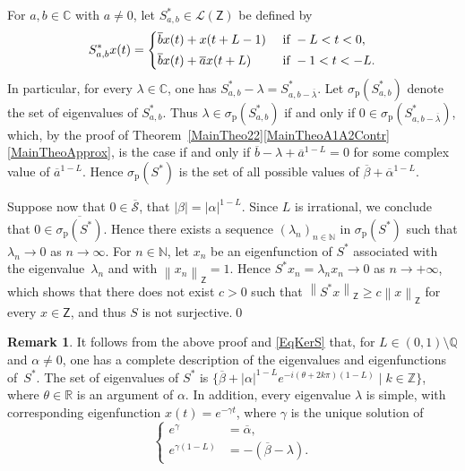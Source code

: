 \documentclass[JEP,XML,SOM,Unicode]{cedram}
\theoremstyle{plain}
\theoremstyle{definition}
\newtheorem{remk}[theo]{Remark}
\newcommand{\norm}[1]{\left\lVert #1\right\lVert}
\newcommand{\abs}[1]{\left\lvert #1\right \rvert}
\begin{document}
For $a, b \in \mathbb C$ with $a \neq 0$, let $S_{a, b}^\ast \in \mathcal L(\mathsf Z)$ be defined by
\[
S_{a, b}^\ast x(t) =
\begin{dcases}
\overline b x(t) + x(t + L - 1) & \text{ if } -L < t < 0, \\
\overline b x(t) + \overline a x(t + L) & \text{ if } -1 < t < -L.
\end{dcases}
\]
In particular, for every $\lambda \in \mathbb C$, one has $S_{a, b}^\ast - \lambda = S_{a, b - \overline\lambda}^\ast$. Let $\sigma_{\mathrm p}(S_{a, b}^\ast)$ denote the set of eigenvalues of $S_{a, b}^\ast$. Thus $\lambda \in \sigma_{\mathrm p}(S_{a, b}^\ast)$ if and only if $0 \in \sigma_{\mathrm p}(S_{a, b - \overline\lambda}^\ast)$, which, by the proof of Theorem~\ref{MainTheo22}\eqref{MainTheoA1A2Contr}\eqref{MainTheoApprox}, is the case if and only if $\overline b - \lambda + \overline a^{1-L} = 0$ for some complex value of $\overline a^{1-L}$. Hence $\sigma_{\mathrm p}(S^\ast)$ is the set of all possible values of $\overline\beta + \overline\alpha^{1-L}$.

Suppose now that $0 \in \overline{\mathcal S}$, \ie that $\abs{\beta} = \abs{\alpha}^{1-L}$. Since $L$ is irrational, we conclude that $0 \in \overline{\sigma_{\mathrm p}(S^\ast)}$. Hence there exists a sequence $(\lambda_n)_{n \in \mathbb N}$ in $\sigma_{\mathrm p}(S^\ast)$ such that $\lambda_n \to 0$ as $n \to \infty$. For $n \in \mathbb N$, let $x_n$ be an eigenfunction of $S^\ast$ associated with the eigenvalue~$\lambda_n$ and with $\norm{x_n}_{\mathsf Z} = 1$. Hence $S^\ast x_n = \lambda_n x_n \to 0$ as $n \to +\infty$, which shows that there does not exist $c > 0$ such that $\norm{S^\ast x}_{\mathsf Z} \geq c \norm{x}_{\mathsf Z}$ for every $x \in \mathsf Z$, and thus $S$ is not surjective.\qed

\begin{remk}
\label{RemkEigenpairsS}
It follows from the above proof and \eqref{EqKerS} that, for $L \in (0, 1) \setminus \mathbb Q$ and $\alpha \neq 0$, one has a complete description of the eigenvalues and eigenfunctions of~$S^\ast$. The set of eigenvalues of $S^\ast$ is $\{\overline\beta + \abs{\alpha}^{1 - L} e^{- i (\theta + 2 k \pi)(1 - L)} \mid k \in \mathbb Z\}$, where $\theta \in \mathbb R$ is an argument of $\alpha$. In addition, every eigenvalue $\lambda$ is simple, with corresponding eigenfunction $x(t) = e^{- \gamma t}$, where $\gamma$ is the unique solution of
\[
\left\{
\begin{aligned}
e^{\gamma} & = \overline\alpha, \\
e^{\gamma(1 - L)} & = - (\overline\beta - \lambda).
\end{aligned}
\right.
\]
\end{remk}
\end{document}
